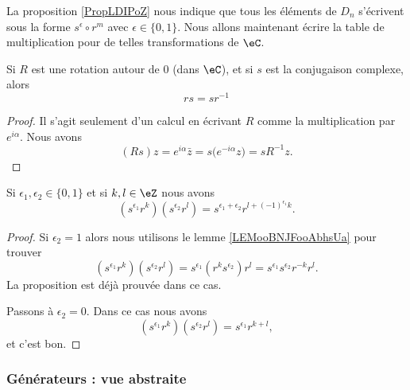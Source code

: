 La proposition \ref{PropLDIPoZ} nous indique que tous les éléments de \( D_n\) s'écrivent sous la forme \( s^{\epsilon}\circ r^m\) avec \( \epsilon\in\{ 0,1 \}\). Nous allons maintenant écrire la table de multiplication pour de telles transformations de \( \eC\).

\begin{lemma}       \label{LEMooBNJFooAbhsUa}
	Si \( R\) est une rotation autour de \( 0\) (dans \( \eC\)), et si \( s\) est la conjugaison complexe, alors
	\begin{equation}
		rs=sr^{-1}
	\end{equation}
\end{lemma}

\begin{proof}
	Il s'agit seulement d'un calcul en écrivant \( R\) comme la multiplication par \(  e^{i\alpha}\). Nous avons
	\begin{equation}
		(Rs)z= e^{i\alpha}\bar z=s\big(  e^{-i\alpha}z \big)=sR^{-1}z.
	\end{equation}
\end{proof}

\begin{proposition}     \label{PROPooPYDLooLgiUjk}
	Si \( \epsilon_1,\epsilon_2\in\{ 0,1 \}\) et si \( k,l\in \eZ\) nous avons
	\begin{equation}
		(s^{\epsilon_1}r^k)(s^{\epsilon_2}r^l)=s^{\epsilon_1+\epsilon_2}r^{l+(-1)^{\epsilon_1}k}.
	\end{equation}
\end{proposition}

\begin{proof}
	Si \( \epsilon_2=1\) alors nous utilisons le lemme \ref{LEMooBNJFooAbhsUa} pour trouver
	\begin{equation}
		(s^{\epsilon_1}r^k)(s^{\epsilon_2}r^l)=s^{\epsilon_1}(r^ks^{\epsilon_2})r^l=s^{\epsilon_1}s^{\epsilon_2}r^{-k}r^l.
	\end{equation}
	La proposition est déjà prouvée dans ce cas.

	Passons à \( \epsilon_2=0\). Dans ce cas nous avons
	\begin{equation}
		(s^{\epsilon_1}r^k)(s^{\epsilon_2}r^l)=s^{\epsilon_1}r^{k+l},
	\end{equation}
	et c'est bon.
\end{proof}

\subsubsection{Générateurs : vue abstraite}


